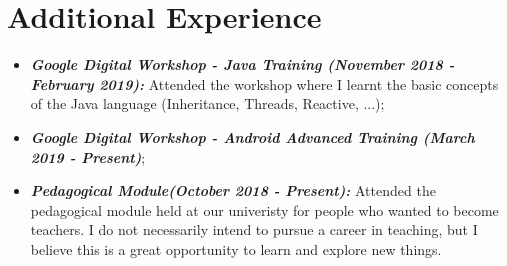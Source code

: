 \documentclass{article}
\begin{document}
    \section*{Additional Experience}
        \begin{itemize}
            \item \footnotesize \textbf{\textit{Google Digital Workshop - Java Training (November 2018 - February 2019):}} Attended the workshop where I learnt the basic concepts of the Java language (Inheritance, Threads, Reactive, ...);
            \item \footnotesize \textbf{\textit{Google Digital Workshop - Android Advanced Training (March 2019 - Present)}};
            \item \textbf{\textit{Pedagogical Module(October 2018 - Present):}} Attended the pedagogical module held at our univeristy for people who wanted to become teachers. I do not necessarily intend to pursue a career in teaching, but I believe this is a great opportunity to learn and explore new things. 
        \end{itemize}
    
\end{document}
